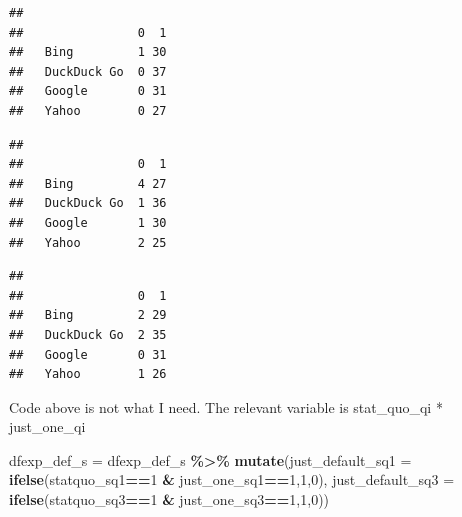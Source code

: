 \documentclass[
  11pt,
]{article}
\newenvironment{Shaded}{\begin{snugshade}}{\end{snugshade}}
\newcommand{\AttributeTok}[1]{\textcolor[rgb]{0.13,0.29,0.53}{#1}}
\newcommand{\DecValTok}[1]{\textcolor[rgb]{0.00,0.00,0.81}{#1}}
\newcommand{\FunctionTok}[1]{\textcolor[rgb]{0.13,0.29,0.53}{\textbf{#1}}}
\newcommand{\NormalTok}[1]{#1}
\newcommand{\OtherTok}[1]{\textcolor[rgb]{0.56,0.35,0.01}{#1}}
\newcommand{\SpecialCharTok}[1]{\textcolor[rgb]{0.81,0.36,0.00}{\textbf{#1}}}
\begin{document}
\begin{verbatim}
##              
##                0  1
##   Bing         1 30
##   DuckDuck Go  0 37
##   Google       0 31
##   Yahoo        0 27
\end{verbatim}

\begin{Shaded}
\end{Shaded}

\begin{verbatim}
##              
##                0  1
##   Bing         4 27
##   DuckDuck Go  1 36
##   Google       1 30
##   Yahoo        2 25
\end{verbatim}

\begin{Shaded}
\end{Shaded}

\begin{verbatim}
##              
##                0  1
##   Bing         2 29
##   DuckDuck Go  2 35
##   Google       0 31
##   Yahoo        1 26
\end{verbatim}

Code above is not what I need. The relevant variable is stat\_quo\_qi * just\_one\_qi

\begin{Shaded}
\begin{Highlighting}[]
\NormalTok{dfexp\_def\_s }\OtherTok{=}\NormalTok{ dfexp\_def\_s }\SpecialCharTok{\%\textgreater{}\%} 
  \FunctionTok{mutate}\NormalTok{(}\AttributeTok{just\_default\_sq1 =} \FunctionTok{ifelse}\NormalTok{(statquo\_sq1}\SpecialCharTok{==}\DecValTok{1} \SpecialCharTok{\&}\NormalTok{ just\_one\_sq1}\SpecialCharTok{==}\DecValTok{1}\NormalTok{,}\DecValTok{1}\NormalTok{,}\DecValTok{0}\NormalTok{),}
         \AttributeTok{just\_default\_sq3 =} \FunctionTok{ifelse}\NormalTok{(statquo\_sq3}\SpecialCharTok{==}\DecValTok{1} \SpecialCharTok{\&}\NormalTok{ just\_one\_sq3}\SpecialCharTok{==}\DecValTok{1}\NormalTok{,}\DecValTok{1}\NormalTok{,}\DecValTok{0}\NormalTok{))}
\end{Highlighting}
\end{Shaded}
\end{document}
